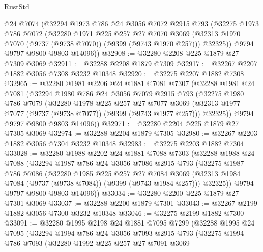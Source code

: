 \begin{lexlean}{RustStd}
\begin{coremodule}
      @24
      @7074
      (@32294
        @1973
        @786
        @24
        @3056
        @7072
        @2915
        @793
        (@32275
          @1973
          @786
          @7072
          (@32280
            @1971
            @225
            @257
            @27
            @7070
            @3069
            (@32313 @1970 @7070 (@9737 (@9738 @7070)) (@9399 (@9743 @1970 @257)))
            @32325))
        @9794
        @9797
        @9800
        @9803
        @14096))
@32908 := @32280 @2208 @225 @1879 @27 @7309 @3069
@32911 := @32288 @2208 @1879 @7309
@32917 := @32267 @2207 @1882 @3056 @7308 @3232 @10348
@32920 := @32275 @2207 @1882 @7308
@32965 := @32280
    @1981
    @2206
    @24
    @1881
    @7081
    @7307
    (@32288
      @1981
      @24
      @7081
      (@32294
        @1980
        @786
        @24
        @3056
        @7079
        @2915
        @793
        (@32275
          @1980
          @786
          @7079
          (@32280
            @1978
            @225
            @257
            @27
            @7077
            @3069
            (@32313 @1977 @7077 (@9737 (@9738 @7077)) (@9399 (@9743 @1977 @257)))
            @32325))
        @9794
        @9797
        @9800
        @9803
        @14096))
@32971 := @32280 @2204 @225 @1879 @27 @7305 @3069
@32974 := @32288 @2204 @1879 @7305
@32980 := @32267 @2203 @1882 @3056 @7304 @3232 @10348
@32983 := @32275 @2203 @1882 @7304
@33028 := @32280
    @1988
    @2202
    @24
    @1881
    @7088
    @7303
    (@32288
      @1988
      @24
      @7088
      (@32294
        @1987
        @786
        @24
        @3056
        @7086
        @2915
        @793
        (@32275
          @1987
          @786
          @7086
          (@32280
            @1985
            @225
            @257
            @27
            @7084
            @3069
            (@32313 @1984 @7084 (@9737 (@9738 @7084)) (@9399 (@9743 @1984 @257)))
            @32325))
        @9794
        @9797
        @9800
        @9803
        @14096))
@33034 := @32280 @2200 @225 @1879 @27 @7301 @3069
@33037 := @32288 @2200 @1879 @7301
@33043 := @32267 @2199 @1882 @3056 @7300 @3232 @10348
@33046 := @32275 @2199 @1882 @7300
@33091 := @32280
    @1995
    @2198
    @24
    @1881
    @7095
    @7299
    (@32288
      @1995
      @24
      @7095
      (@32294
        @1994
        @786
        @24
        @3056
        @7093
        @2915
        @793
        (@32275
          @1994
          @786
          @7093
          (@32280
            @1992
            @225
            @257
            @27
            @7091
            @3069

\end{coremodule}
\end{lexlean}

